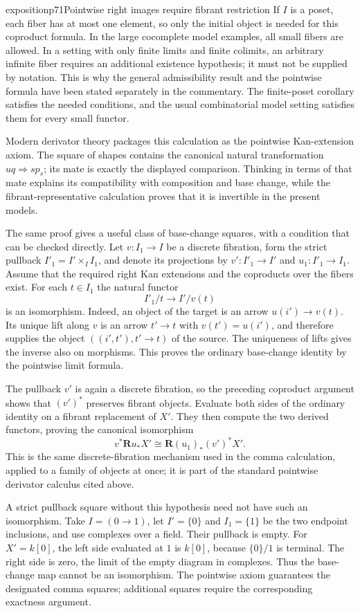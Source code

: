 \begin{dcomment}{exposition}{p71}{Pointwise right images require fibrant restriction}
If $I$ is a poset, each fiber has at most one element, so only the initial object is needed for this coproduct formula. In the large cocomplete model examples, all small fibers are allowed. In a setting with only finite limits and finite colimits, an arbitrary infinite fiber requires an additional existence hypothesis; it must not be supplied by notation. This is why the general admissibility result and the pointwise formula have been stated separately in the commentary. The finite-poset corollary satisfies the needed conditions, and the usual combinatorial model setting satisfies them for every small functor.

Modern derivator theory packages this calculation as the pointwise Kan-extension axiom. The square of shapes contains the canonical natural transformation $uq\Rightarrow s p_s$; its mate is exactly the displayed comparison. Thinking in terms of that mate explains its compatibility with composition and base change, while the fibrant-representative calculation proves that it is invertible in the present models.

The same proof gives a useful class of base-change squares, with a condition that can be checked directly. Let $v:I_1\to I$ be a discrete fibration, form the strict pullback $I'_1=I'\times_I I_1$, and denote its projections by $v':I'_1\to I'$ and $u_1:I'_1\to I_1$. Assume that the required right Kan extensions and the coproducts over the fibers exist. For each $t\in I_1$ the natural functor
\[
                         I'_1/t\longrightarrow I'/v(t)
\]
is an isomorphism. Indeed, an object of the target is an arrow $u(i')\to v(t)$. Its unique lift along $v$ is an arrow $t'\to t$ with $v(t')=u(i')$, and therefore supplies the object $((i',t'),t'\to t)$ of the source. The uniqueness of lifts gives the inverse also on morphisms. This proves the ordinary base-change identity by the pointwise limit formula.

The pullback $v'$ is again a discrete fibration, so the preceding coproduct argument shows that $(v')^*$ preserves fibrant objects. Evaluate both sides of the ordinary identity on a fibrant replacement of $X'$. They then compute the two derived functors, proving the canonical isomorphism
\[
                      v^*\mathbf Ru_*X'
                     \cong\mathbf R(u_1)_*(v')^*X'.
\]
This is the same discrete-fibration mechanism used in the comma calculation, applied to a family of objects at once; it is part of the standard pointwise derivator calculus cited above.

A strict pullback square without this hypothesis need not have such an isomorphism. Take $I=(0\to1)$, let $I'=\{0\}$ and $I_1=\{1\}$ be the two endpoint inclusions, and use complexes over a field. Their pullback is empty. For $X'=k[0]$, the left side evaluated at $1$ is $k[0]$, because $\{0\}/1$ is terminal. The right side is zero, the limit of the empty diagram in complexes. Thus the base-change map cannot be an isomorphism. The pointwise axiom guarantees the designated comma squares; additional squares require the corresponding exactness argument.
\end{dcomment}

